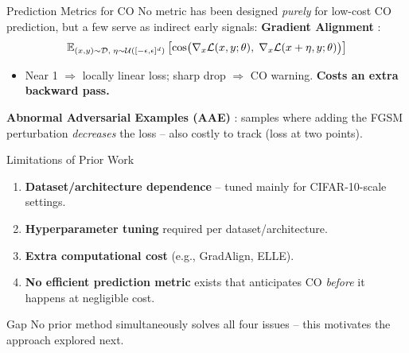 \documentclass[11pt,aspectratio=169]{beamer}
\begin{document}
\begin{frame}{Prediction Metrics for CO} %
  No metric has been designed \emph{purely} for low-cost CO prediction, but a few serve as indirect early signals:
  \vskip 0.25cm
  \textbf{Gradient Alignment} \cite{andriushchenko2020understanding}:
  \[
  \small
  \mathbb{E}_{(x,y)\sim\mathcal{D},\; \eta\sim\mathcal{U}([-\epsilon,\epsilon]^d)} \left[ \cos\!\big( \nabla_x \mathcal{L}(x, y; \theta),\; \nabla_x \mathcal{L}(x+\eta, y; \theta) \big) \right]
  \]
  \begin{itemize}
    \item Near 1 $\Rightarrow$ locally linear loss; sharp drop $\Rightarrow$ CO warning. \textbf{Costs an extra backward pass.}
  \end{itemize}
  \vskip 0.25cm
  \textbf{Abnormal Adversarial Examples (AAE)} \cite{lin2023eliminating}: samples where adding the FGSM perturbation \emph{decreases} the loss -- also costly to track (loss at two points).
\end{frame}

\begin{frame}{Limitations of Prior Work}
  \begin{enumerate}
    \item \textbf{Dataset/architecture dependence} -- tuned mainly for CIFAR-10-scale settings.
    \item \textbf{Hyperparameter tuning} required per dataset/architecture.
    \item \textbf{Extra computational cost} (e.g., GradAlign, ELLE).
    \item \textbf{No efficient prediction metric} exists that anticipates CO \emph{before} it happens at negligible cost.
  \end{enumerate}
  \vskip 0.2cm
  \begin{block}{Gap}
    No prior method simultaneously solves all four issues -- this motivates the approach explored next.
  \end{block}
\end{frame}


\end{document}
